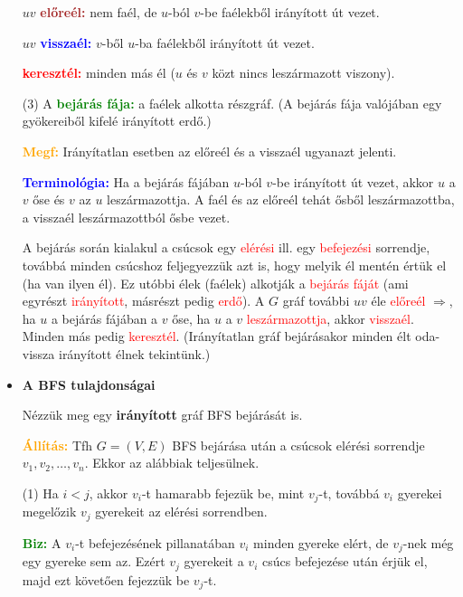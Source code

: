 \documentclass[../../szobeli.tex]{subfiles}
\begin{document}
\begin{itemize}
			$uv$ \textbf{\textcolor{brown}{előreél:}} nem faél, de $u$-ból $v$-be faélekből irányított út vezet.

			$uv$ \textbf{\textcolor{blue}{visszaél:}} $v$-ből $u$-ba faélekből irányított út vezet.

			\textbf{\textcolor{red}{keresztél:}} minden más él ($u$ és $v$ közt nincs leszármazott viszony).

			(3) A \textbf{\textcolor{green}{bejárás fája:}} a faélek alkotta részgráf. (A bejárás fája valójában egy gyökereiből kifelé irányított erdő.)

			\textbf{\textcolor{orange}{Megf:}} Irányítatlan esetben az előreél és a visszaél ugyanazt jelenti.

			\textbf{\textcolor{blue}{Terminológia:}} Ha a bejárás fájában $u$-ból $v$-be irányított út vezet, akkor $u$ a $v$ őse és $v$ az $u$ leszármazottja. A faél és az előreél tehát ősből leszármazottba, a visszaél leszármazottból ősbe vezet.
            
            A bejárás során kialakul a csúcsok egy \textcolor{red}{elérési} ill. egy \textcolor{red}{befejezési} sorrendje, továbbá minden csúcshoz feljegyezzük azt is, hogy melyik él mentén értük el (ha van ilyen él). Ez utóbbi élek ({faélek}) alkotják a \textcolor{red}{bejárás fáját} (ami egyrészt \textcolor{red}{irányított}, másrészt pedig \textcolor{red}{erdő}). A $G$ gráf további $uv$ éle \textcolor{red}{előreél} $\Rightarrow$, ha $u$ a bejárás fájában a $v$ őse, ha $u$ a $v$ \textcolor{red}{leszármazottja}, akkor \textcolor{red}{visszaél}. Minden más pedig \textcolor{red}{keresztél}. (Irányítatlan gráf bejárásakor minden élt oda-vissza irányított élnek tekintünk.)

        \item \textbf{A BFS tulajdonságai}
			
        Nézzük meg egy \textbf{irányított} gráf BFS bejárását is.

        \textbf{\textcolor{Orange}{Állítás:}} Tfh $G=(V,E)$ BFS bejárása után a csúcsok elérési sorrendje $v_1,v_2,\dots,v_n$. Ekkor az alábbiak teljesülnek.

        (1) Ha $i < j$, akkor $v_i$-t hamarabb fejezük be, mint $v_j$-t, továbbá $v_i$ gyerekei megelőzik $v_j$ gyerekeit az elérési sorrendben.

        \textbf{\textcolor{green}{Biz:}} A $v_i$-t befejezésének pillanatában $v_i$ minden gyereke elért, de $v_j$-nek még egy gyereke sem az. Ezért $v_j$ gyerekeit a $v_i$ csúcs befejezése után érjük el, majd ezt követően fejezzük be $v_j$-t.   


\end{itemize}
\end{document}
